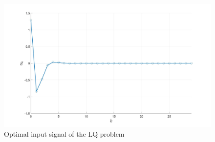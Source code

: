\documentclass[12pt,pdftex,a4paper]{scrartcl}
\begin{document}
\begin{enumerate}
    \begin{figure}[H]
	\centering
	\includegraphics[scale=0.2]{pics/prop_2g_U.jpg}
	\caption{Optimal input signal of the LQ problem}	
	\label{fig:pic_2g_U}
    \end{figure}
    
\end{enumerate}
\end{document}
